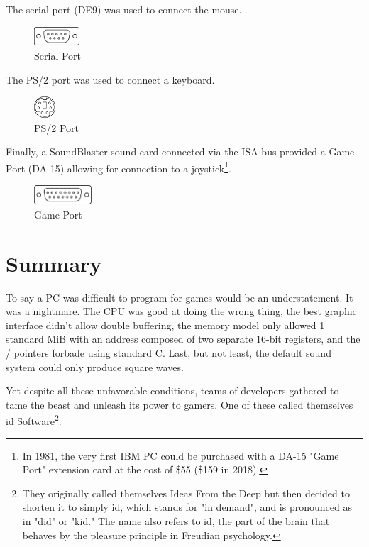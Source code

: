\documentclass[book.tex]{subfiles}
\begin{document}
The serial port (DE9) was used to connect the mouse.
 \begin{figure}[H]
\centering
\includegraphics[width=0.15\textwidth]{imgs/drawings/ports/DE9_serial_port.eps}
\caption{Serial Port}
\label{fig:serialPort}
\end{figure}

The PS/2 port was used to connect a keyboard.
 \begin{figure}[H]
\centering
\includegraphics[width=0.07\textwidth]{imgs/drawings/ports/MiniDIN-6_PS2.eps}
\caption{PS/2 Port}
\label{fig:ps2Port}
\end{figure}


Finally, a SoundBlaster sound card connected via the ISA bus provided a Game Port (DA-15) allowing for connection to a joystick\footnote{In 1981, the very first IBM PC could be purchased with a DA-15 "Game Port" extension card at the cost of \$55 (\$159 in 2018).}.
 \begin{figure}[H]
\centering
\includegraphics[width=0.19\textwidth]{imgs/drawings/ports/DA-15_GamePort.eps}
\caption{Game Port}
\label{fig:gamePort}
\end{figure}



\section{Summary}
To say a PC was difficult to program for games would be an understatement. It was a nightmare. The CPU was good at doing the wrong thing, the best graphic interface didn't allow double buffering, the memory model only allowed 1 standard MiB with an address composed of two separate 16-bit registers, and the / pointers forbade using standard C. Last, but not least, the default sound system could only produce square waves.\\
\par
Yet despite all these unfavorable conditions, teams of developers gathered to tame the beast and unleash its power to gamers. One of these called themselves id Software\footnote{They originally called themselves Ideas From the Deep but then decided to shorten it to simply id, which stands for "in demand", and is pronounced as in "did" or "kid." The name also refers to id, the part of the brain that behaves by the pleasure principle in Freudian psychology.}.
\end{document}
